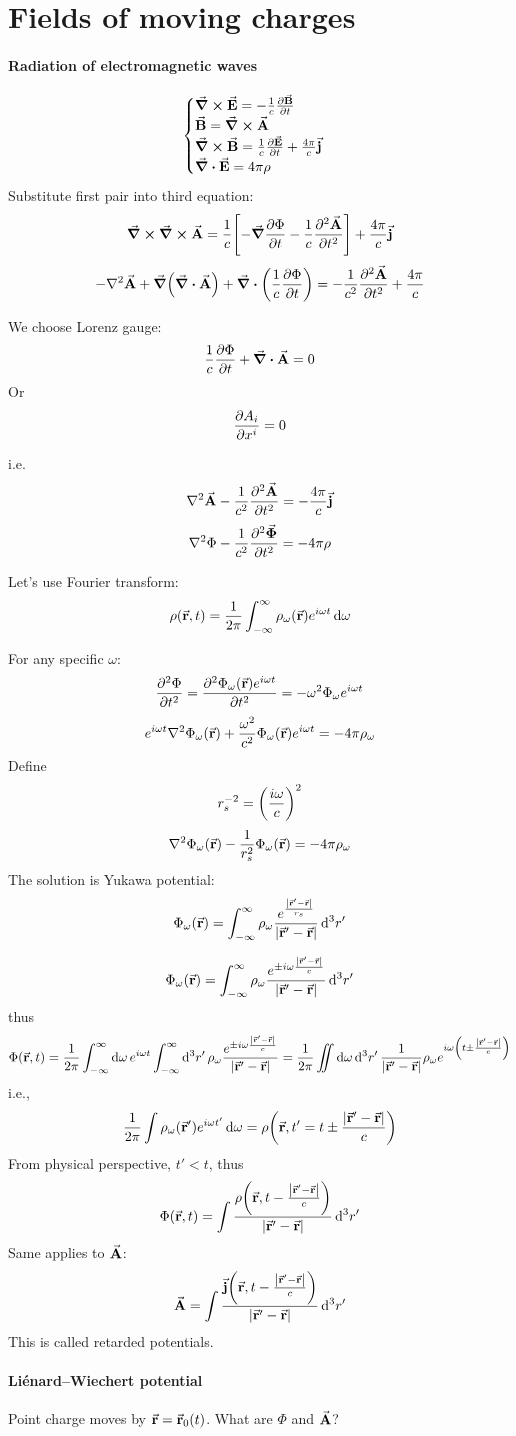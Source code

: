 \section{Fields of moving charges}
\paragraph{Radiation of electromagnetic waves}
$$\begin{cases}
\curl{\va{E}} = - \frac{1}{c} \pdv{\va{B}}{t}\\
\va{B}=\curl{\va{A}}\\
\curl{\va{B}} =  \frac{1}{c} \pdv{\va{E}}{t} + \frac{4\pi}{c} \va{j}\\
\div{\va{E}} = 4\pi \rho
\end{cases}$$
Substitute first pair into third equation:
$$\curl{\curl{\va{A}}} = \frac{1}{c} \qty[-\grad{\pdv{\Phi}{t}} - \frac{1}{c} \pdv[2]{\va{A}}{t}] + \frac{4\pi}{c} \va{j}$$
$$-\laplacian{\va{A}} + \grad(\div{\va{A}}) + \div(\frac{1}{c} \pdv{\Phi}{t}) = -\frac{1}{c^2} \pdv[2]{\va{A}}{t} + \frac{4\pi}{c}$$

We choose Lorenz gauge:
$$\frac{1}{c} \pdv{\Phi}{t} + \div{\va{A}} = 0$$
Or
$$\pdv{A_i}{x^i} = 0$$

i.e.
$$\laplacian{\va{A}} -\frac{1}{c^2} \pdv[2]{\va{A}}{t} = -\frac{4\pi}{c}\va{j}$$
$$\laplacian{\Phi} -\frac{1}{c^2} \pdv[2]{\va{\Phi}}{t} = -4\pi \rho$$

Let's use Fourier transform:
$$ \rho(\va{r}, t)  = \frac{1}{2\pi} \int_{-\infty}^\infty \rho_\omega(\va{r}) e^{i\omega t} \dd{\omega}$$

For any specific $\omega$:
$$\pdv[2]{\Phi}{t} = \pdv[2]{\Phi_{\omega}(\va{r}) e^{i\omega t}}{t} = -\omega^2 \Phi_{\omega}e^{i\omega t}$$
$$e^{i\omega t} \laplacian{\Phi_{\omega}(\va{r})} + \frac{\omega^2}{c^2} \Phi_{\omega}(\va{r}) e^{i\omega t} = -4\pi \rho_\omega $$
Define 
$$r_s^{-2} = \qty(\frac{i\omega}{c})^2$$
$$\laplacian{\Phi_{\omega}(\va{r})}  - \frac{1}{r_s^2}\Phi_{\omega}(\va{r}) = -4\pi \rho_\omega$$
The solution is Yukawa potential:
$$\Phi_{\omega}(\va{r}) = \int_{-\infty}^\infty \rho_\omega \frac{e^{\frac{\abs{\va{r}' - \va{r}}}{r_s}}}{\abs{\va{r}' - \va{r}}} \dd[3]{r'}$$

$$\Phi_{\omega}(\va{r}) = \int_{-\infty}^\infty \rho_\omega \frac{e^{\pm i\omega\frac{ \abs{\va{r}' - \va{r}}}{c}}}{\abs{\va{r}' - \va{r}}} \dd[3]{r'}$$
thus
$$\Phi(\va{r},t) = \frac{1}{2\pi} \int_{-\infty}^{\infty} \dd{\omega} e^{i\omega t} \int_{-\infty}^{\infty} \dd[3]{r'} \rho_\omega \frac{e^{\pm i\omega\frac{ \abs{\va{r}' - \va{r}}}{c}}}{\abs{\va{r}' - \va{r}}} = \frac{1}{2\pi} \iint \dd{\omega} \dd[3]{r'} \frac{1}{\abs{\va{r}' - \va{r}}} \rho_\omega  e^{ i\omega \qty(t\pm\frac{ \abs{\va{r}' - \va{r}}}{c})}$$
i.e.,
$$\frac{1}{2\pi} \int \rho_{\omega} (\va{r}') e^{i\omega t'} \dd{\omega} = \rho\qty(\va{r}, t' = t\pm \frac{ \abs{\va{r}' - \va{r}}}{c})$$
From physical perspective, $t'<t$, thus
$$\Phi(\va{r},t) = \int \frac{\rho\qty(\va{r}, t - \frac{ \abs{\va{r}' - \va{r}}}{c})}{ \abs{\va{r}' - \va{r}}} \dd[3]{r'}$$ 
Same applies to $\va{A}$:
$$\va{A} = \int \frac{\va{j}\qty(\va{r}, t - \frac{ \abs{\va{r}' - \va{r}}}{c})}{ \abs{\va{r}' - \va{r}}} \dd[3]{r'}$$
This is called retarded potentials.
\paragraph{Li\'{e}nard–Wiechert potential }
Point charge moves by $\va{r} = \va{r}_0(t)$. What are $\Phi$ and $\va{A}$?
